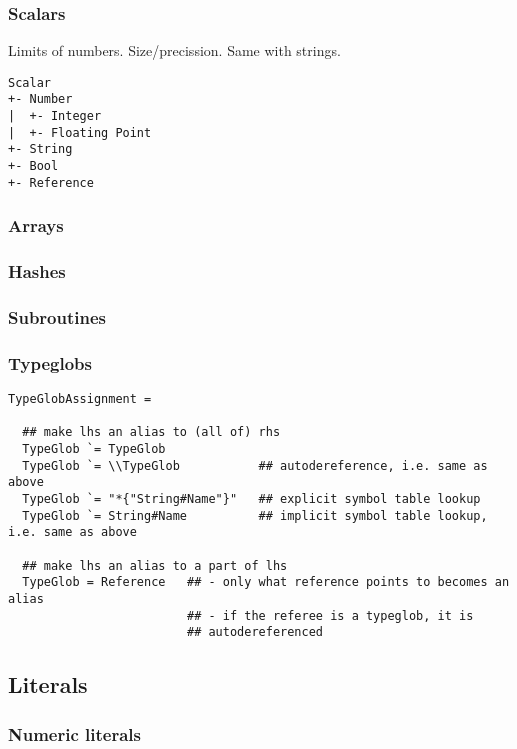 \documentclass{article}
\begin{document}
\subsubsection{Scalars}
Limits of numbers. Size/precission. Same with strings.

\begin{verbatim}
Scalar
+- Number
|  +- Integer
|  +- Floating Point
+- String
+- Bool 
+- Reference 
\end{verbatim}

\subsubsection{Arrays}

\subsubsection{Hashes}

\subsubsection{Subroutines}

\subsubsection{Typeglobs}

\begin{verbatim}
TypeGlobAssignment =       
                   
  ## make lhs an alias to (all of) rhs
  TypeGlob `= TypeGlob
  TypeGlob `= \\TypeGlob           ## autodereference, i.e. same as above
  TypeGlob `= "*{"String#Name"}"   ## explicit symbol table lookup
  TypeGlob `= String#Name          ## implicit symbol table lookup, i.e. same as above

  ## make lhs an alias to a part of lhs
  TypeGlob = Reference   ## - only what reference points to becomes an alias
                         ## - if the referee is a typeglob, it is
                         ## autodereferenced
\end{verbatim}


\subsection{Literals}

\subsubsection{Numeric literals}
\end{document}
